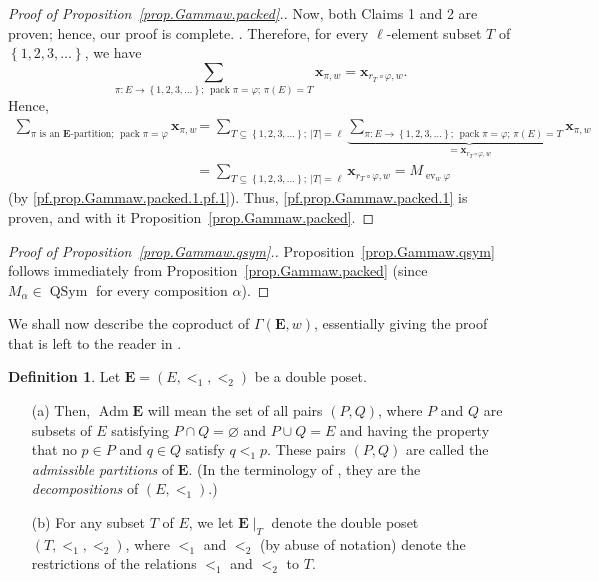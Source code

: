 \documentclass[12pt]{article}
\theoremstyle{plain}
\theoremstyle{definition}
\newtheorem{definition}[theorem]{Definition}
\theoremstyle{remark}
\let\sumnonlimits\sum
\renewcommand{\sum}{\sumnonlimits\limits}
\newcommand{\xx}{{\mathbf{x}}}
\newcommand{\ev}{\operatorname{ev}}
\newcommand{\Adm}{\operatorname{Adm}}
\newcommand{\pack}{\operatorname{pack}}
\newcommand{\QSym}{{\operatorname{QSym}}}
\newcommand{\EE}{{\mathbf{E}}}
\begin{document}
\begin{proof}[Proof of Proposition~\ref{prop.Gammaw.packed}.]
{Now, both Claims 1 and 2 are proven; hence, our proof is complete.
}. Therefore, for every $\ell$-element subset $T$ of
$\left\{1, 2, 3, \ldots\right\}$, we have
\[
\sum_{\pi : E \to \left\{1, 2, 3, \ldots\right\} \text{; } \pack \pi = \varphi
\text{; } \pi\left(E\right) = T}
\xx_{\pi, w}
= \xx_{r_T\circ\varphi,w} .
\]
Hence,
\begin{align*}
\sum_{\pi\text{ is an }\EE\text{-partition; } \pack \pi = \varphi}
\xx_{\pi, w}
&= \sum_{T \subseteq \left\{1, 2, 3, \ldots\right\} ; \ \left|T\right| = \ell}
\underbrace{\sum_{\pi : E \to \left\{1, 2, 3, \ldots\right\} \text{; } \pack \pi = \varphi
\text{; } \pi\left(E\right) = T}
\xx_{\pi, w}}_{= \xx_{r_T\circ\varphi,w}} \\
&= \sum_{T \subseteq \left\{1, 2, 3, \ldots\right\} ; \ \left|T\right| = \ell}
\xx_{r_T\circ\varphi,w}
= M_{\ev_w \varphi}
\end{align*}
(by \eqref{pf.prop.Gammaw.packed.1.pf.1}).
Thus, \eqref{pf.prop.Gammaw.packed.1}
is proven, and with it Proposition~\ref{prop.Gammaw.packed}.
\end{proof}

\begin{proof}[Proof of Proposition~\ref{prop.Gammaw.qsym}.]
Proposition~\ref{prop.Gammaw.qsym} follows immediately from
Proposition~\ref{prop.Gammaw.packed}
(since \newline
$M_\alpha \in \QSym$ for every composition $\alpha$).
\end{proof}

We shall now describe the coproduct of $\Gamma\left(\EE, w\right)$,
essentially giving the proof that is left to the reader in
\cite[Theorem 2.2]{Mal-Reu-DP}.

\begin{definition}
Let $\EE = \left(E, <_1, <_2\right)$ be a double poset.

\begin{itemize}

\item[(a)]
Then, $\Adm \EE$ will mean the set of all pairs
$\left(P, Q\right)$, where $P$ and $Q$ are subsets of $E$ satisfying
$P \cap Q = \varnothing$ and $P \cup Q = E$ and having the property
that no $p \in P$ and $q \in Q$ satisfy $q <_1 p$. These pairs
$\left(P, Q\right)$ are
called the \textit{admissible partitions} of $\EE$. (In the
terminology of \cite{Mal-Reu-DP}, they are the
\textit{decompositions} of $\left(E, <_1\right)$.)

\item[(b)] For
any subset $T$ of $E$, we let $\EE\mid_T$ denote the double poset
$\left(T, <_1, <_2\right)$, where $<_1$ and $<_2$ (by abuse of
notation) denote the restrictions of the relations $<_1$ and $<_2$
to $T$.

\end{itemize}
\end{definition}
\end{document}
